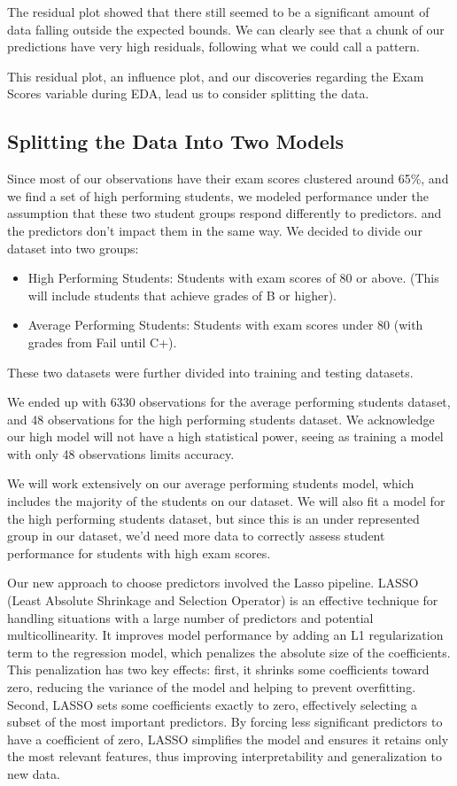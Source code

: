 \documentclass[twocolumn]{article} %
\begin{document}
The residual plot showed that there still seemed to be a significant amount of data falling outside the expected bounds. We can clearly see that a chunk of our predictions have very high residuals, following what we could call a pattern.

This residual plot, an influence plot, and our discoveries regarding the Exam Scores variable during EDA, lead us to consider splitting the data.

\subsection*{Splitting the Data Into Two Models}
Since most of our observations have their exam scores clustered around 65\%, and we find a set of high performing students, we modeled performance under the assumption that these two student groups respond differently to predictors. and the predictors don't impact them in the same way. We decided to divide our dataset into two groups:
\begin{itemize}
  \item High Performing Students: Students with exam scores of 80 or above. (This will include students that achieve grades of B or higher).
  \item Average Performing Students: Students with exam scores under 80 (with grades from Fail until C+).
\end{itemize}
These two datasets were further divided into training and testing datasets.

We ended up with 6330 observations for the average performing students dataset, and 48 observations for the high performing students dataset. We acknowledge our high model will not have a high statistical power, seeing as training a model with only 48 observations limits accuracy. 

We will work extensively on our average performing students model, which includes the majority of the students on our dataset. We will also fit a model for the high performing students dataset, but since this is an under represented group in our dataset, we'd need more data to correctly assess student performance for students with high exam scores.

Our new approach to choose predictors involved the Lasso pipeline. LASSO (Least Absolute Shrinkage and Selection Operator) is an effective technique for handling situations with a large number of predictors and potential multicollinearity. It improves model performance by adding an L1 regularization term to the regression model, which penalizes the absolute size of the coefficients. This penalization has two key effects: first, it shrinks some coefficients toward zero, reducing the variance of the model and helping to prevent overfitting. Second, LASSO sets some coefficients exactly to zero, effectively selecting a subset of the most important predictors. By forcing less significant predictors to have a coefficient of zero, LASSO simplifies the model and ensures it retains only the most relevant features, thus improving interpretability and generalization to new data.
\end{document}
